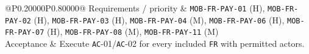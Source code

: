 \begin{longtable}{@{}P{0.20000\SRSWidth}P{0.80000\SRSWidth}@{}}
Requirements /\allowbreak{} priority & \texttt{MOB-\allowbreak{}FR-\allowbreak{}PAY-\allowbreak{}01} (H), \texttt{MOB-\allowbreak{}FR-\allowbreak{}PAY-\allowbreak{}02} (H), \texttt{MOB-\allowbreak{}FR-\allowbreak{}PAY-\allowbreak{}03} (H), \texttt{MOB-\allowbreak{}FR-\allowbreak{}PAY-\allowbreak{}04} (M), \texttt{MOB-\allowbreak{}FR-\allowbreak{}PAY-\allowbreak{}06} (H), \texttt{MOB-\allowbreak{}FR-\allowbreak{}PAY-\allowbreak{}07} (H), \texttt{MOB-\allowbreak{}FR-\allowbreak{}PAY-\allowbreak{}08} (M), \texttt{MOB-\allowbreak{}FR-\allowbreak{}PAY-\allowbreak{}11} (M) \\[3pt]
Acceptance & Execute \texttt{AC}-01/\allowbreak{}\texttt{AC}-02 for every included \texttt{FR} with permitted actors. \\[3pt]
\end{longtable}
\endgroup

